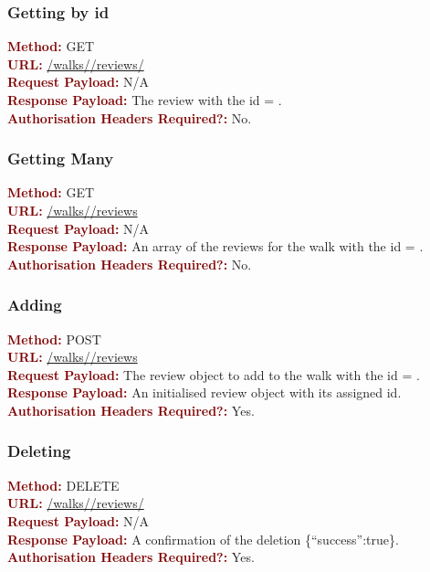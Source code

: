 \documentclass[11pt,a4paper]{report}
\begin{document}
\subsubsection{Getting by id}
\textbf{\textcolor{Maroon}{Method:}} GET\\
\textbf{\textcolor{Maroon}{URL:}} \url{/walks/}\url{/reviews/}\\
\textbf{\textcolor{Maroon}{Request Payload:}} N/A\\
\textbf{\textcolor{Maroon}{Response Payload:}} The review with the id = .\\
\textbf{\textcolor{Maroon}{Authorisation Headers Required?:}} No.

\subsubsection{Getting Many}
\textbf{\textcolor{Maroon}{Method:}} GET\\
\textbf{\textcolor{Maroon}{URL:}} \url{/walks/}\url{/reviews}\\
\textbf{\textcolor{Maroon}{Request Payload:}} N/A\\
\textbf{\textcolor{Maroon}{Response Payload:}} An array of the reviews for the walk with the id = .\\
\textbf{\textcolor{Maroon}{Authorisation Headers Required?:}} No.

\subsubsection{Adding}
\textbf{\textcolor{Maroon}{Method:}} POST\\
\textbf{\textcolor{Maroon}{URL:}} \url{/walks/}\url{/reviews}\\
\textbf{\textcolor{Maroon}{Request Payload:}} The review object to add to the walk with the id = .\\
\textbf{\textcolor{Maroon}{Response Payload:}} An initialised review object with its assigned id.\\
\textbf{\textcolor{Maroon}{Authorisation Headers Required?:}} Yes.

\subsubsection{Deleting}
\textbf{\textcolor{Maroon}{Method:}} DELETE\\
\textbf{\textcolor{Maroon}{URL:}} \url{/walks/}\url{/reviews/}\\
\textbf{\textcolor{Maroon}{Request Payload:}} N/A\\
\textbf{\textcolor{Maroon}{Response Payload:}} A confirmation of the deletion \{``success'':true\}.\\
\textbf{\textcolor{Maroon}{Authorisation Headers Required?:}} Yes.
\end{document}
